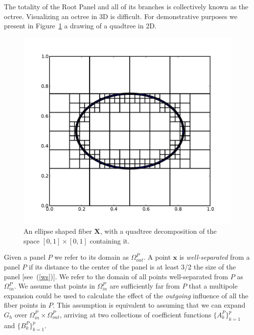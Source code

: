 \documentclass[preprint,12pt]{elsarticle}
\newcommand{\B}[1]{\mathbf{#1}}
\begin{document}
The totality of the Root Panel  and all of its branches is collectively known as the octree. Visualizing an octree in 3D is difficult. For demonstrative purposes we present  in Figure~\ref{fig:PanelDecomp} a drawing of a quadtree in 2D.
\begin{figure}[!b]
  \begin{center}
    \includegraphics[bb=0in 0in 7.7in 6.3in,width=4.8in,clip]{Panels.pdf}
  \end{center}
  \caption{\small An ellipse shaped fiber $\B{X}$, with a quadtree decomposition of the space $[0,1]\times [0,1]$ containing it.}
  \label{fig:PanelDecomp}
\end{figure}

Given a panel $P$ we refer to its domain as $\Omega_{out}^P$.
A point $\B{x}$ is {\em well-separated} from a panel $P$ if  its  distance to the center of the panel is at least 3/2 the size of the panel [see~(\ref{ws})].
We refer to the domain of all points well-separated from $P$ as $\Omega_{in}^P$.
We assume that points in $\Omega_{in}^P$ are sufficiently far from $P$ that a multipole expansion could be used to calculate the effect of the {\em outgoing} influence of all the fiber points in $P$.  This assumption is equivalent to assuming that we can expand $G_h$ over $\Omega_{in}^P\times\Omega_{out}^P$, arriving at two collections of coefficient functions $\{A_k^P\}_{k=1}^p$ and $\{B_k^P\}_{k=1}^p$. 
\end{document}

